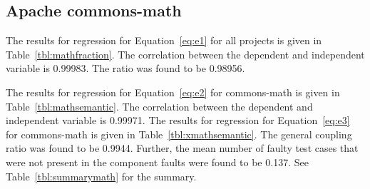 \documentclass[preprint,nonatbib]{sigplanconf}\usepackage[]{graphicx}\usepackage[]{color}
\begin{document}
\subsection{Apache commons-math}
\begin{table}
\centering
{}
\caption{Commons-math regression for \kappaT. $R^2=$0.99983}
\label{tbl:mathfraction}
\end{table}
The results for regression for Equation~\ref{eq:e1} for all projects is
given in Table~\ref{tbl:mathfraction}.
The correlation between the dependent
and independent variable is 0.99983.
The \couplingC ratio
was found to be 0.98956.
\begin{table}
\centering
{}
\caption{Commons-math regression. $R^2=$0.99971}
\label{tbl:mathsemantic}
\end{table}
\begin{table}
\centering
{}
\caption{Commons-math regression for general coupling ratio. $R^2=$0.99983}
\label{tbl:xmathsemantic}
\end{table}
The results for regression for Equation~\ref{eq:e2} for commons-math is
given in Table~\ref{tbl:mathsemantic}.
The correlation between the dependent
and independent variable is 0.99971.
The results for regression for Equation~\ref{eq:e3} for commons-math is
given in Table~\ref{tbl:xmathsemantic}.
The general coupling ratio
was found to be 0.9944.
Further, the mean number of faulty test cases that were not present in the
component faults were found to be 0.137.
See Table~\ref{tbl:summarymath} for the summary.
\end{document}
